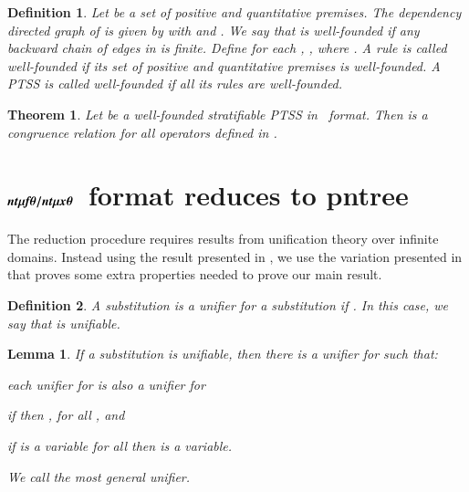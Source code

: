 \documentclass[submission,copyright,creativecommons]{eptcs}
\newtheorem{definition}{Definition}
\newtheorem{theorem}{Theorem}
\newtheorem{lemma}{Lemma}
\newcommand{\bntmuft}{\ensuremath{\textit{\bfseries nt}\boldmath\mu\textit{\bfseries f}\boldmath\theta}}
\newcommand{\bntmuxt}{\ensuremath{\textit{\bfseries nt}\boldmath\mu\textit{\bfseries x}\boldmath\theta}}
\newcommand{\bntmufxt}{\ensuremath{\bntmuft/\bntmuxt}}
\begin{document}
\begin{definition}
 Let  be a set of positive and quantitative premises.
 The \emph{dependency directed graph} of  is given by  with
  and
.
We say that  is \emph{well-founded} if any backward chain of edges in   is finite.
Define for each , ,
 where .   
A rule is called \emph{well-founded} if its set of positive and quantitative premises is well-founded. 
 A PTSS is called \emph{well-founded} if all its rules are well-founded. 
\end{definition}



\begin{theorem}\label{th:congruence}
 Let  be a well-founded stratifiable PTSS in \ format. Then  is a congruence relation for all operators defined in .
\end{theorem}




\section{\bntmufxt\ format reduces to pntree}\label{sec:reduction_pntree}


The reduction procedure requires results from unification theory over infinite domains.  
Instead using the result presented in \cite{Fokkink1997183}, we use the 
variation presented in \cite[Lemma 3.2]{FokkinkvanGlabbeek96} that proves some extra
properties needed to prove our main result.


\begin{definition}
 A substitution  is a \emph{unifier} for a substitution  if .
 In this case, we say that  is \emph{unifiable}.
\end{definition}

\begin{lemma}\label{lemma:unification}
 If a substitution  is unifiable, then there is a unifier  for   such that:
\begin{inparaenum}[(i)]
  \item each unifier  for  is also a unifier for 
  \item if  then , for all , and
  \item if  is a variable for all  then  is a variable.
 \end{inparaenum}
We call  the most general unifier.
\end{lemma}
\end{document}
